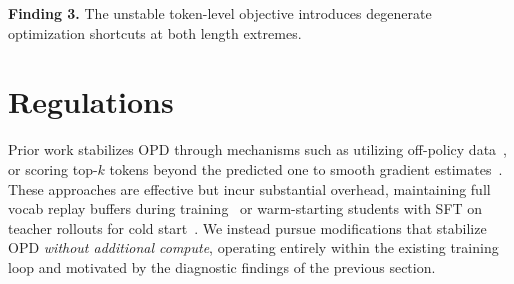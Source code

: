 \documentclass[11pt]{article}
\begin{document}
\begin{tcolorbox}[colback=gray!5, colframe=gray!60, boxrule=0.4pt, left=4pt, right=4pt, top=2pt, bottom=2pt]
\textbf{Finding 3.}
The unstable token-level objective introduces degenerate optimization shortcuts at both length extremes.
\end{tcolorbox}







\section{Regulations}\label{sec:signal-regulation}

Prior work stabilizes OPD through mechanisms such as utilizing off-policy data~\cite{opd-var-1}, or scoring top-$k$ tokens beyond the predicted one to smooth gradient estimates~\cite{deepseekai2026deepseekv4}.
These approaches are effective but incur substantial overhead, maintaining full vocab replay buffers during training~\cite{deepseekai2026deepseekv4} or warm-starting students with SFT on teacher rollouts for cold start~\cite{opd-var-1}.
We instead pursue modifications that stabilize OPD \emph{without additional compute}, operating entirely within the existing training loop and motivated by the diagnostic findings of the previous section.
\end{document}
